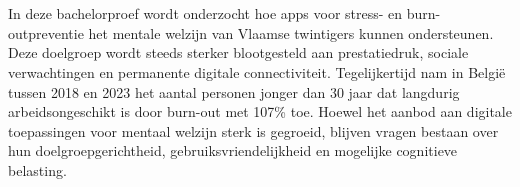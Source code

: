 
%
%
%
%
%

%



\chapter*{}

In deze bachelorproef wordt onderzocht hoe apps voor stress- en burn-outpreventie het mentale welzijn van Vlaamse twintigers kunnen ondersteunen. Deze doelgroep wordt steeds sterker blootgesteld aan prestatiedruk, sociale verwachtingen en permanente digitale connectiviteit. Tegelijkertijd nam in België tussen 2018 en 2023 het aantal personen jonger dan 30 jaar dat langdurig arbeidsongeschikt is door burn-out met 107\% toe. Hoewel het aanbod aan digitale toepassingen voor mentaal welzijn sterk is gegroeid, blijven vragen bestaan over hun doelgroepgerichtheid, gebruiksvriendelijkheid en mogelijke cognitieve belasting.

